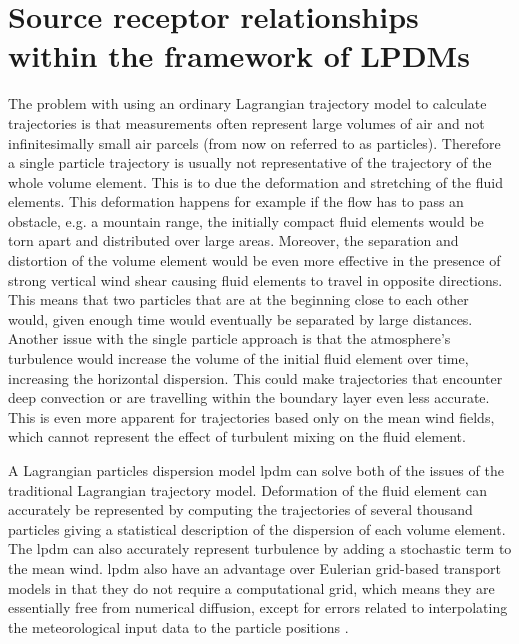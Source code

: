 \makeatletter\@openrightfalse
\chapter{Source receptor relationships within the framework of LPDMs}\label{appendix:lpdm_SRR}

The problem with using an ordinary Lagrangian trajectory model to calculate trajectories is that measurements 
often represent large volumes of air and not infinitesimally small air parcels (from now on referred to as 
particles). Therefore a single particle trajectory is usually not representative of the trajectory of the 
whole volume element. This is to due the deformation and stretching of the fluid elements. This deformation 
happens for example if the flow has to pass an obstacle, e.g. a mountain range, the initially compact fluid 
elements would be torn apart and distributed over large areas. Moreover, the separation and distortion of the
volume element would be even more effective in the presence of strong vertical wind shear causing fluid 
elements to travel in opposite directions. This means that two particles that are at the beginning close to 
each other would, given enough time would eventually be separated by large distances. Another issue with the 
single particle approach is that the atmosphere's turbulence would increase the volume of the initial 
fluid element over time, increasing the horizontal dispersion. This could make trajectories that encounter 
deep convection or are travelling within the boundary layer even less accurate. This is even more apparent for 
trajectories based only on the mean wind fields, which cannot represent the effect of turbulent 
mixing on the fluid element. 

A Lagrangian particles dispersion model \acrshort{lpdm} can solve both of the issues 
of the traditional Lagrangian trajectory model. Deformation of the fluid element can accurately be 
represented by computing the trajectories of several thousand particles giving a statistical description of 
the dispersion of each volume element. The \acrshort{lpdm} can also accurately represent turbulence by adding a 
stochastic term to the mean wind. 
\acrshort{lpdm} also have an advantage over Eulerian grid-based transport models in that they do not require a 
computational grid, which means they are essentially free from numerical diffusion, except for errors 
related to interpolating the meteorological input data to the particle positions 
\parencite{cassiani_offline_2016}. 

